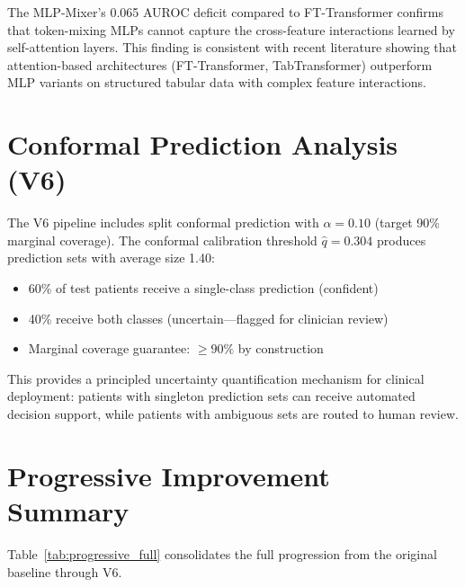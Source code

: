 The MLP-Mixer's 0.065 AUROC deficit compared to FT-Transformer confirms that token-mixing MLPs cannot capture the cross-feature interactions learned by self-attention layers. This finding is consistent with recent literature showing that attention-based architectures (FT-Transformer, TabTransformer) outperform MLP variants on structured tabular data with complex feature interactions.

\section{Conformal Prediction Analysis (V6)}

The V6 pipeline includes split conformal prediction with $\alpha = 0.10$ (target 90\% marginal coverage). The conformal calibration threshold $\hat{q} = 0.304$ produces prediction sets with average size 1.40:

\begin{itemize}
\item 60\% of test patients receive a single-class prediction (confident)
\item 40\% receive both classes (uncertain---flagged for clinician review)
\item Marginal coverage guarantee: $\geq 90\%$ by construction
\end{itemize}

This provides a principled uncertainty quantification mechanism for clinical deployment: patients with singleton prediction sets can receive automated decision support, while patients with ambiguous sets are routed to human review.

\section{Progressive Improvement Summary}

Table~\ref{tab:progressive_full} consolidates the full progression from the original baseline through V6.

